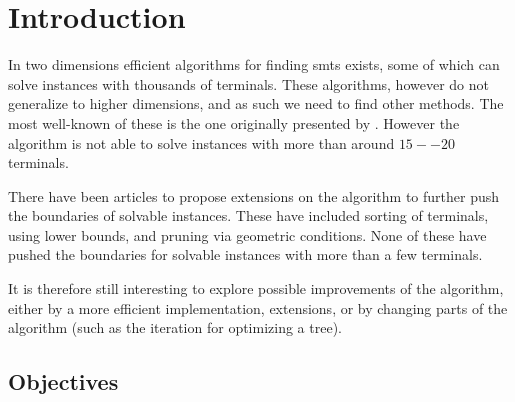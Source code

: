 {
\abnormalparskip{0pt}
\chapter{Introduction}
\label{cha:introduction}
}

In two dimensions efficient algorithms for finding \aclp{smt} exists, some of
which can solve instances with thousands of terminals. These algorithms, however do
not generalize to higher dimensions, and as such we need to find other methods.
The most well-known of these is the one originally presented by
\textcite{smith1992}. However the algorithm is not able to solve instances with
more than around $15--20$ terminals.

There have been articles to propose extensions on the algorithm to further push
the boundaries of solvable instances. These have included sorting of terminals,
using lower bounds, and pruning via geometric conditions. None of these have
pushed the boundaries for solvable instances with more than a few terminals.

It is therefore still interesting to explore possible improvements of the
algorithm, either by a more efficient implementation, extensions, or by changing
parts of the algorithm (such as the iteration for optimizing a tree).

\section{Objectives}
\label{sec:objectives}

